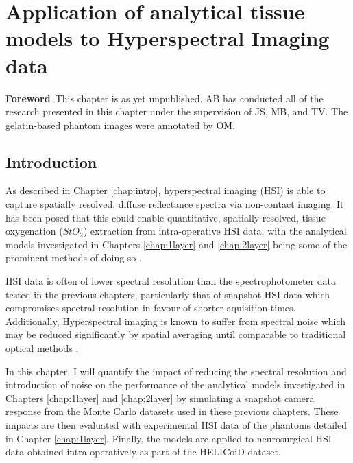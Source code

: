 \chapter[Application of models to HSI data]{Application of analytical tissue models to Hyperspectral Imaging data}\label{chap:HSImodel}
\begin{center}
\begin{minipage}[b]{0.9\linewidth}
\small
\textbf{Foreword\,}
This chapter is as yet unpublished. 
\newline
AB has conducted all of the research presented in this chapter under the supervision of JS, MB, and TV. The gelatin-based phantom images were annotated by OM. 
\end{minipage}
\end{center}

\minitoc

\section{Introduction}
As described in Chapter \ref{chap:intro}, hyperspectral imaging (HSI) is able to capture spatially resolved, diffuse reflectance spectra via non-contact imaging\cite{Lu2014,Giannoni2018,Calin2014,Shapey2019}. It has been posed that this could enable quantitative, spatially-resolved, tissue oxygenation ($StO_2$) extraction from intra-operative HSI data, with the analytical models investigated in Chapters \ref{chap:1layer} and \ref{chap:2layer} being some of the prominent methods of doing so \cite{Yudovsky2009, Jacques1999, Clancy2015, Clancy2020}. 

HSI data is often of lower spectral resolution than the spectrophotometer data tested in the previous chapters, particularly that of snapshot HSI data which compromises spectral resolution in favour of shorter aquisition times\cite{Geelen2014}. Additionally, Hyperspectral imaging is known to suffer from spectral noise which may be reduced significantly by spatial averaging until comparable to traditional optical methods \cite{Zhang2020}.

In this chapter, I will quantify the impact of reducing the spectral resolution and introduction of noise on the performance of the analytical models investigated in Chapters \ref{chap:1layer} and \ref{chap:2layer} by simulating a snapshot camera response from the Monte Carlo datasets used in these previous chapters. These impacts are then evaluated with experimental HSI data of the phantoms detailed in Chapter \ref{chap:1layer}. Finally, the models are applied to neurosurgical HSI data obtained intra-operatively as part of the HELICoiD dataset. %

